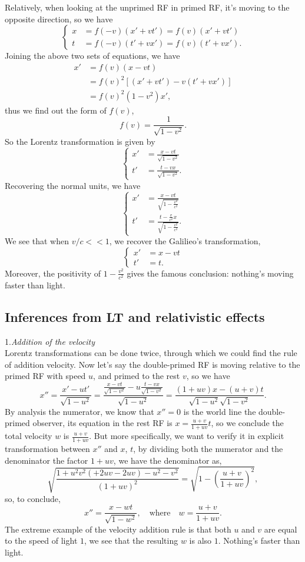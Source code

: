 \documentclass{article}
\newcommand{\be}{\begin{equation}}
\newcommand{\ee}{\end{equation}}
\newcommand{\1}{\left}
\newcommand{\2}{\right}
\begin{document}
Relatively, when looking at the unprimed RF in primed RF, it's moving to the opposite direction, so we have
\be\1\{\begin{split}
x&=f(-v)(x'+vt')=f(v)(x'+vt')\\
t&=f(-v)(t'+vx')=f(v)(t'+vx').
\end{split}\2.\ee
Joining the above two sets of equations, we have
\be\begin{split}
x'&=f(v)(x-vt)\\
&=f(v)^2[(x'+vt')-v(t'+vx')]\\
&=f(v)^2(1-v^2)x',
\end{split}\ee
thus we find out the form of $f(v)$,
\be
f(v)=\frac1{\sqrt{1-v^2}}.
\ee
So the Lorentz transformation is given by
\be\1\{\begin{split}
x'&=\frac{x-vt}{\sqrt{1-v^2}}\\
t'&=\frac{t-vx}{\sqrt{1-v^2}}.
\end{split}\2.\ee
Recovering the normal units, we have
\be\1\{\begin{split}
x'&=\frac{x-vt}{\sqrt{1-\frac{v^2}{c^2}}}\\
t'&=\frac{t-\frac v{c^2}x}{\sqrt{1-\frac{v^2}{c^2}}}.
\end{split}\2.\ee
We see that when $v/c<<1$, we recover the Galilieo's transformation,
\be\1\{\begin{split}
x'&=x-vt\\
t'&=t.
\end{split}\2.\ee
Moreover, the positivity of $1-\frac{v^2}{c^2}$ gives the famous conclusion: nothing's moving faster than light.\\

\subsection{Inferences from LT and relativistic effects}

1.\textsl{Addition of the velocity}\\

Lorentz transformations can be done twice, through which we could find the rule of addition velocity. Now let's say the double-primed RF is moving relative to the primed RF with speed $u$, and primed to the rest $v$, so we have
\be
x''=\frac{x'-ut'}{\sqrt{1-u^2}}=\frac{\frac{x-vt}{\sqrt{1-v^2}}-u\frac{t-vx}{\sqrt{1-v^2}}}{\sqrt{1-u^2}}
=\frac{(1+uv)x-(u+v)t}{\sqrt{1-u^2}\sqrt{1-v^2}}.
\ee
By analysis the numerator, we know that $x''=0$ is the world line the double-primed observer, its equation in the rest RF is $x=\frac{u+v}{1+uv} t$, so we conclude the total velocity $w$ is $\frac{u+v}{1+uv}$. But more specifically, we want to verify it in explicit transformation between $x''$ and $x$, $t$, by dividing both the numerator and the denominator the factor $1+uv$, we have the denominator as,
\be
\sqrt{\frac{1+u^2v^2(+2uv-2uv)-u^2-v^2}{(1+uv)^2}}=\sqrt{1-\1(\frac{u+v}{1+uv}\2)^2},
\ee
so, to conclude,
\be
x''=\frac{x-wt}{\sqrt{1-w^2}}, \quad\text{where}\quad w=\frac{u+v}{1+uv}.
\ee
The extreme example of the velocity addition rule is that both $u$ and $v$ are equal to the speed of light $1$, we see that the resulting $w$ is also $1$. Nothing's faster than light.\\
\end{document}
